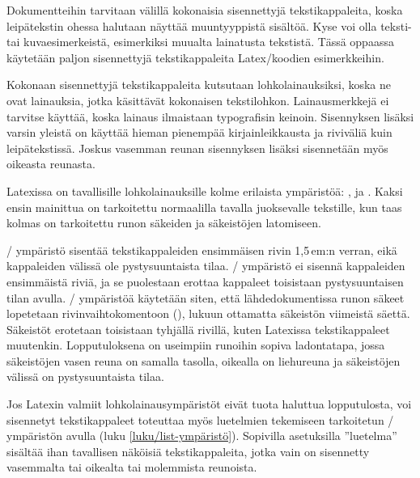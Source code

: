 Dokumentteihin tarvitaan välillä kokonaisia sisennettyjä
tekstikappaleita, koska leipätekstin ohessa halutaan näyttää
muuntyyppistä sisältöä. Kyse voi olla teksti- tai kuvaesimerkeistä,
esimerkiksi muualta lainatusta tekstistä. Tässä oppaassa käytetään
paljon sisennettyjä tekstikappaleita Latex\-/koodien esimerkkeihin.

Kokonaan sisennettyjä tekstikappaleita kutsutaan lohkolainauksiksi,
koska ne ovat lainauksia, jotka käsittävät kokonaisen tekstilohkon.
Lainausmerkkejä ei tarvitse käyttää, koska lainaus ilmaistaan
typografisin keinoin. Sisennyksen lisäksi varsin yleistä on käyttää
hieman pienempää kirjainleikkausta ja riviväliä kuin leipätekstissä.
Joskus vasemman reunan sisennyksen lisäksi sisennetään myös oikeasta
reunasta.

Latexissa on tavallisille lohkolainauksille kolme erilaista ympäristöä:
,  ja . Kaksi
ensin mainittua on tarkoitettu normaalilla tavalla juoksevalle
tekstille, kun taas kolmas on tarkoitettu runon säkeiden ja säkeistöjen
latomiseen.

\-/ ympäristö sisentää tekstikappaleiden
ensimmäisen rivin 1,5\,em:n verran, eikä kappaleiden välissä ole
pystysuuntaista tilaa. \-/ ympäristö ei sisennä
kappaleiden ensimmäistä riviä, ja se puolestaan erottaa kappaleet
toisistaan pystysuuntaisen tilan avulla. \-/ ympäristöä
käytetään siten, että lähdedokumentissa runon säkeet lopetetaan
rivinvaihtokomentoon (\komento{\keno}), lukuun ottamatta säkeistön
viimeistä säettä. Säkeistöt erotetaan toisistaan tyhjällä rivillä, kuten
Latexissa tekstikappaleet muutenkin. Lopputuloksena on useimpiin
runoihin sopiva ladontatapa, jossa säkeistöjen vasen reuna on samalla
tasolla, oikealla on liehureuna ja säkeistöjen välissä on
pystysuuntaista tilaa.

Jos Latexin valmiit lohkolainausympäristöt eivät tuota haluttua
lopputulosta, voi sisennetyt tekstikappaleet toteuttaa myös luetelmien
tekemiseen tarkoitetun \-/ ympäristön avulla (luku
\ref{luku/list-ympäristö}). Sopivilla asetuksilla ''luetelma'' sisältää
ihan tavallisen näköisiä tekstikappaleita, jotka vain on sisennetty
vasemmalta tai oikealta tai molemmista reunoista.

